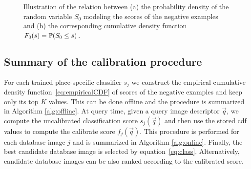       \begin{figure}[t]
         \vspace*{-3mm}
         \caption{Illustration of the relation between (a) the probability density of the random variable $S_0$ modeling the scores of the negative examples and (b) the corresponding cumulative density function $F_0(s)=\mathbb{P}(S_0 \leq s)$.
         }
               \vspace*{-3mm}
         \label{fig:qntExample}
      \end{figure}
      
      
   \subsection{Summary of the calibration procedure}
    
    For each trained place-specific classifier $s_j$ we construct the empirical cumulative density function~\eqref{eq:empiricalCDF} of scores of the negative examples and keep only its top $K$ values. This can be done offline and the procedure is summarized in Algorithm \ref{alg:offline}. 
    At query time, given a query image descriptor $\vec{q}$, we compute the uncalibrated classification score $s_j(\vec{q})$ and then use
    the stored cdf values to compute the calibrate score $f_j(\vec{q})$. This procedure is performed for each database image $j$ and is summarized in Algorithm \ref{alg:online}.
    Finally, the best candidate database image is selected by equation~\eqref{eq:class}. Alternatively, candidate database images can be also ranked according to the calibrated score.
 
